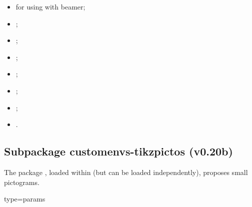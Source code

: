 \documentclass[english,11pt,a4paper]{article}
\begin{document}
\begin{itemize}
	\item {} for using with \textsf{beamer};
	\item {};
	\item {};
	\item {};
	\item {};
	\item {};
	\item {};
	\item {}.
\end{itemize}

\begin{codehigh}[language=latex/latex3,style/main=teal!25,style/code=teal!25]
\usepackage{customenvs}

\usepackage[option(s)]{customenvs}
\end{codehigh}

\pagebreak

\subsection{Subpackage customenvs-tikzpictos (v0.20b)}

The package , loaded within  (but can be loaded independently), proposes small pictograms.

\begin{codehigh}[language=latex/latex3,style/main=teal!25,style/code=teal!25]

    {type=params}

\end{codehigh}
\end{document}
